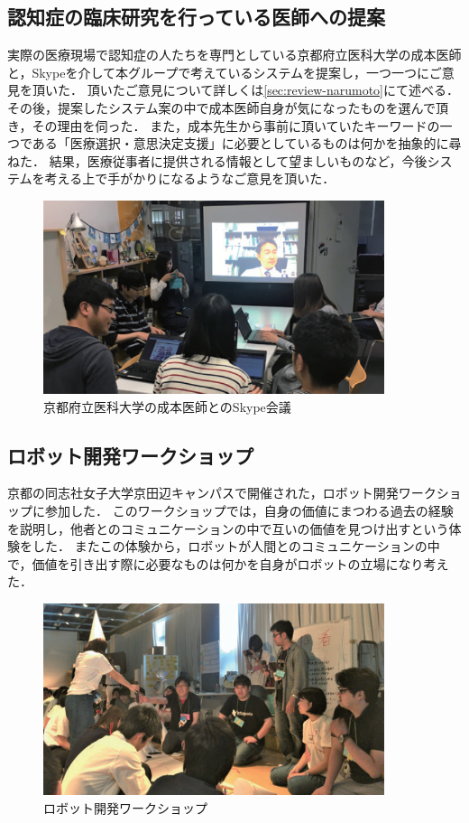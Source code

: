 \documentclass[../report]{subfiles}
\begin{document}
\subsection{認知症の臨床研究を行っている医師への提案}
実際の医療現場で認知症の人たちを専門としている京都府立医科大学の成本医師と，Skypeを介して本グループで考えているシステムを提案し，一つ一つにご意見を頂いた．
頂いたご意見について詳しくは\ref{sec:review-narumoto}にて述べる．
その後，提案したシステム案の中で成本医師自身が気になったものを選んで頂き，その理由を伺った．
また，成本先生から事前に頂いていたキーワードの一つである「医療選択・意思決定支援」に必要としているものは何かを抽象的に尋ねた．
結果，医療従事者に提供される情報として望ましいものなど，今後システムを考える上で手がかりになるようなご意見を頂いた．
\begin{figure}[htbp]
    \begin{center}
        \includegraphics[width=10cm]{imgs/ninchisyo-kaigi.png}
        \caption{京都府立医科大学の成本医師とのSkype会議}
        \label{fig:ninchisyo-kaigi}
    \end{center}
\end{figure}

\subsection{ロボット開発ワークショップ}
京都の同志社女子大学京田辺キャンパスで開催された，ロボット開発ワークショップに参加した．
このワークショップでは，自身の価値にまつわる過去の経験を説明し，他者とのコミュニケーションの中で互いの価値を見つけ出すという体験をした．
またこの体験から，ロボットが人間とのコミュニケーションの中で，価値を引き出す際に必要なものは何かを自身がロボットの立場になり考えた．
\begin{figure}[htbp]
    \begin{center}
        \includegraphics[width=10cm]{imgs/ninchisyo-ws.png}
        \caption{ロボット開発ワークショップ}
        \label{fig:ninchisyo-ws}
    \end{center}
\end{figure}
\end{document}
